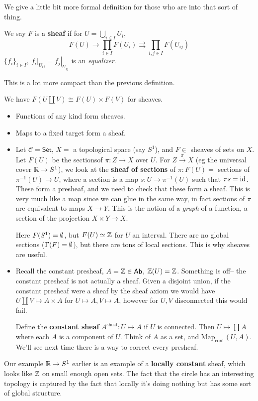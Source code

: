 We give a little bit more formal definition for those who are into that sort of thing.

\begin{definition}[]
    We say $F$ is a \textbf{sheaf} if for $U = \bigcup_{i \in  I} U_i $, 
    \[
    F(U) \to \prod_{i \in I} F(U_i )\rightrightarrows \prod _{i,j \in I}F(U _{ij})
    \] $\{f _i \} _{i \in I}, \ \left. f_i  \right| _{U_{ij}}=\left. f_j \right| _{U_{ij}} $ is an \emph{equalizer}.
\end{definition}
This is a lot more compact than the previous definition.

\begin{example}
    We have $F( U \amalg V) \cong F(U) \times F(V)$ for sheaves. 
    \begin{itemize}
    \setlength\itemsep{-.2em}
        \item Functions of any kind form sheaves.
        \item Maps to a fixed target form a sheaf.
        \item Let $\mathcal{C} =\mathsf{Set} $, $X=$ a topological space (say $S^1 $), and $F \in $ sheaves of sets on $X$. Let $F(U)$ be the sectionsof $\pi \colon Z \to X$ over $U$. For $Z \xrightarrow{\pi}  X$ (eg the universal cover $\mathbb{R} \to S^1 $), we look at the \textbf{sheaf of sections} of $\pi \colon F(U)=$ sections of $\pi ^{-1} (U) \to U$, where a section is a map $s \colon U \to \pi ^{-1}(U)$ such that $\pi s= \operatorname{id}$. These form a presheaf, and we need to check that these form a sheaf. This is very much like a map since we can glue in the same way, in fact sections of $\pi$ are equivalent to maps $X \to Y$. This is the notion of a \emph{graph} of a function, a section of the projection $X \times Y\to X$. 

            Here $F(S^1 )= \emptyset$, but $F(U) \simeq  \mathbb{Z}$ for $U$ an interval. There are no global sections ($\Gamma(F)=\emptyset$), but there are tons of local sections. This is why sheaves are useful. 
        \item Recall the constant presheaf, $A = \mathbb{Z} \in \mathsf{Ab} $, $\mathbb{Z}(U)= \mathbb{Z}$. Something is off-- the constant presheaf is not actually a sheaf. Given a disjoint union, if the constant presheaf were a sheaf by the sheaf axiom we would have $U \amalg V \mapsto A\times A$ for $U \mapsto A, V\mapsto A$, however for $U,V$ disconnected this would fail. 

            Define the \textbf{constant sheaf} $A^{\mathrm{sheaf}} \colon U \mapsto A $ if $U$ is connected. Then $U \mapsto \prod A$ where each $A$ is a component of $U$. Think of $A$ as a set, and $\mathrm{Map}_{\mathrm{cont}}(U,A)$. We'll see next time there is a way to correct every presheaf.
    \end{itemize}
        Our example $\mathbb{R} \to S^1 $ earlier is an example of a \textbf{locally constant} sheaf, which looks like $\mathbb{Z}$ on small enough open sets. The fact that the circle has an interesting topology is captured by the fact that locally it's doing nothing but has some sort of global structure.
\end{example}
